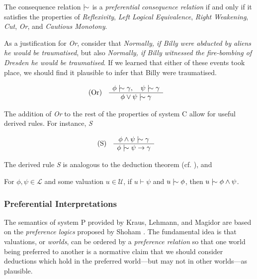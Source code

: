 \begin{definition}
	\label{definition:preferential-relation}

	The consequence relation $\twiddle$ is a \emph{preferential consequence relation} if and only if it satisfies the properties
	of \emph{Reflexivity}, \emph{Left Logical Equivalence}, \emph{Right Weakening}, \emph{Cut}, \emph{Or}, and \emph{Cautious
	Monotony}.
\end{definition}

As a justification for \textit{Or}, consider that \textit{Normally, if Billy were abducted by aliens he would be traumatised},
but also \textit{Normally, if Billy witnessed the fire-bombing of Dresden he would be traumatised}. If we learned that
either of these events took place, we should find it plausible to infer that Billy were traumatised.

\begin{align}
	\inferLeft{Or}{\phi \twiddle \gamma, \quad \psi \twiddle \gamma}{\phi \lor \psi \twiddle \gamma}
\end{align}

The addition of \textit{Or} to the rest of the properties of system C allow for useful derived rules. For instance, \textit{S}

\begin{align}
	\inferLeft{S}{\phi \land \psi \twiddle \gamma}{\phi \twiddle \psi \rightarrow \gamma}
\end{align}

The derived rule \textit{S} is analogous to the deduction theorem (cf. ), and

\begin{lemma}
	For $\phi, \psi \in \mathcal{L}$ and some valuation $u \in \mathcal{U}$, if $u \vdash \psi$ and $u \twiddle \phi$, then
	$u \twiddle \phi \land \psi$.
\end{lemma}

\subsubsection{Preferential Interpretations}
\label{subsubsection:preferential-interpretations}

The semantics of system P provided by Kraus, Lehmann, and Magidor \cite{kraus1990nonmonotonic} are based on the \textit{preference
logics} proposed by Shoham \cite{shohamSemanticApproach}. The fundamental idea is that valuations, or \textit{worlds}, can
be ordered by a \textit{preference relation} so that one world being preferred to another is a normative claim that we
should consider deductions which hold in the preferred world---but may not in other worlds---as plausible.


